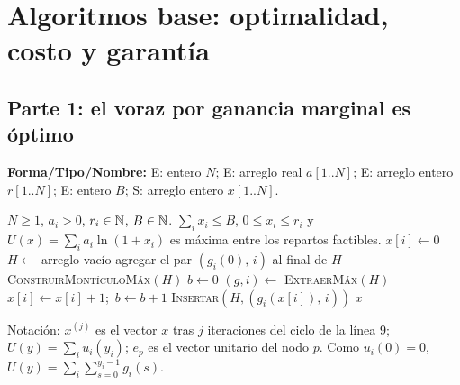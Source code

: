 \section{Algoritmos base: optimalidad, costo y garantía}\label{sec:algoritmos}

\subsection{Parte 1: el voraz por ganancia marginal es óptimo}\label{sec:optimo}

\begin{algorithm}[h]
\caption{\textsc{Reparto} (voraz por ganancia marginal con montículo y topes)}\label{alg:reparto}
\textbf{Forma/Tipo/Nombre:} E: entero $N$; E: arreglo real $a[1..N]$; E: arreglo entero $r[1..N]$; E: entero $B$; S: arreglo entero $x[1..N]$.
\begin{algorithmic}[1]
\Require $N\ge1$, $a_i>0$, $r_i\in\mathbb{N}$, $B\in\mathbb{N}$.
\Ensure $\sum_i x_i\le B$, $0\le x_i\le r_i$ y $U(x)=\sum_i a_i\ln(1+x_i)$ es máxima entre los repartos factibles.
  \State $x[i]\gets 0$
\EndFor
\State $H\gets$ arreglo vacío
    \State agregar el par $(g_i(0),\,i)$ al final de $H$
  \EndIf
\EndFor
\State \textsc{ConstruirMontículoMáx}$(H)$ 
\State $b\gets 0$
  \State $(g,i)\gets$ \textsc{ExtraerMáx}$(H)$
  \State $x[i]\gets x[i]+1$;\ $b\gets b+1$
    \State \textsc{Insertar}$(H,(g_i(x[i]),\,i))$
  \EndIf
\EndWhile
\State \Return $x$
\end{algorithmic}
\end{algorithm}

Notación: $x^{(j)}$ es el vector $x$ tras $j$ iteraciones del ciclo de la línea 9; $U(y)=\sum_iu_i(y_i)$; $e_p$ es el vector unitario del nodo $p$. Como $u_i(0)=0$, $U(y)=\sum_i\sum_{s=0}^{y_i-1}g_i(s)$.

